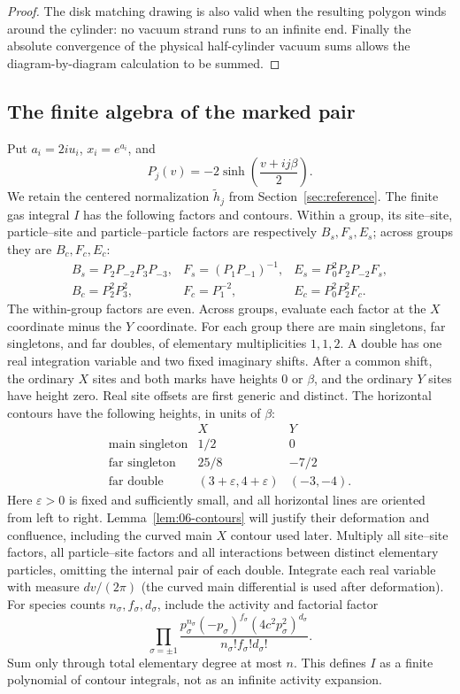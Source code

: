 \begin{proof}
The disk matching drawing is also valid when the resulting polygon
winds around the cylinder: no vacuum strand runs to an infinite end.
Finally the absolute convergence of the physical half-cylinder vacuum
sums allows the diagram-by-diagram calculation to be summed.
\end{proof}

\subsection{The finite algebra of the marked pair}

Put \(a_i=2iu_i\), \(x_i=e^{a_i}\), and
\[
 P_j(v)=-2\sinh\!\left(\frac{v+ij\beta}{2}\right).
\]
We retain the centered normalization \(\widetilde h_j\) from
Section~\ref{sec:reference}. The finite gas integral \(I\) has the
following factors and contours. Within a group, its site--site,
particle--site and particle--particle factors are respectively
\(B_s,F_s,E_s\); across groups they are \(B_c,F_c,E_c\):
\[
\begin{array}{lll}
 B_s=P_2P_{-2}P_3P_{-3},&
 F_s=(P_1P_{-1})^{-1},&
 E_s=P_0^2P_2P_{-2}F_s,\\
 B_c=P_2^2P_3^2,&F_c=P_1^{-2},&
 E_c=P_0^2P_2^2F_c .
\end{array}
\]
The within-group factors are even. Across groups, evaluate each
factor at the \(X\) coordinate minus the \(Y\) coordinate.
For each group there are main singletons, far singletons, and far
doubles, of elementary multiplicities $1,1,2$. A double has one real
integration variable and two fixed imaginary shifts. After a common
shift, the ordinary \(X\) sites and both marks have heights \(0\) or
\(\beta\), and the ordinary \(Y\) sites have height zero. Real site
offsets are first generic and distinct. The horizontal contours have
the following heights, in units of \(\beta\):
\[
\begin{array}{c|cc}
 &X&Y\\ \hline
 \text{main singleton}&1/2&0\\
 \text{far singleton}&25/8&-7/2\\
 \text{far double}&(3+\varepsilon,4+\varepsilon)&(-3,-4).
\end{array}
\]
Here \(\varepsilon>0\) is fixed and sufficiently small, and all
horizontal lines are oriented from left to right.
Lemma~\ref{lem:06-contours} will justify their deformation and
confluence, including the curved main \(X\) contour used later.
Multiply all
site--site factors, all particle--site factors and all interactions
between distinct elementary particles, omitting the internal pair of
each double. Integrate each real variable with measure $dv/(2\pi)$
(the curved main differential is used after deformation). For species
counts $n_\sigma,f_\sigma,d_\sigma$, include the activity and factorial
factor
\[
 \prod_{\sigma=\pm1}
 \frac{p_\sigma^{n_\sigma}(-p_\sigma)^{f_\sigma}
             (4c^2p_\sigma^2)^{d_\sigma}}
      {n_\sigma!f_\sigma!d_\sigma!}.
\]
Sum only through total elementary degree at most $n$. This defines
$I$ as a finite polynomial of contour integrals, not as an infinite
activity expansion.

